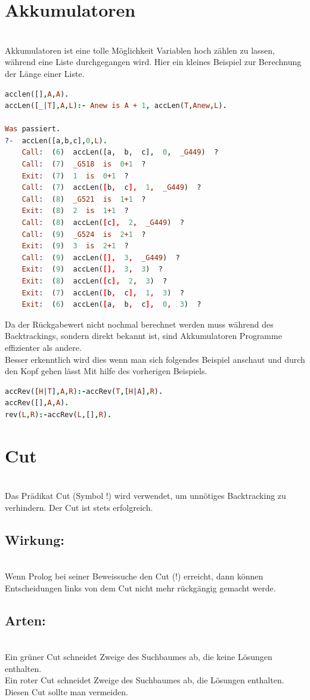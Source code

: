 \section{Akkumulatoren}\qquad\\
Akkumulatoren ist eine tolle Möglichkeit Variablen hoch zählen zu lassen, während eine Liste durchgegangen wird. Hier ein kleines Beispiel zur Berechnung der Länge einer Liste. \\
\begin{lstlisting}[language=Prolog] 
acclen([],A,A).
accLen([_|T],A,L):- Anew is A + 1, accLen(T,Anew,L).

Was passiert.
?-  accLen([a,b,c],0,L).
	Call:  (6)  accLen([a,  b,  c],  0,  _G449)  ?
	Call:  (7)  _G518  is  0+1  ?
	Exit:  (7)  1  is  0+1  ?
	Call:  (7)  accLen([b,  c],  1,  _G449)  ?
	Call:  (8)  _G521  is  1+1  ?
	Exit:  (8)  2  is  1+1  ?
	Call:  (8)  accLen([c],  2,  _G449)  ?
	Call:  (9)  _G524  is  2+1  ?
	Exit:  (9)  3  is  2+1  ?
	Call:  (9)  accLen([],  3,  _G449)  ?
	Exit:  (9)  accLen([],  3,  3)  ?
	Exit:  (8)  accLen([c],  2,  3)  ?
	Exit:  (7)  accLen([b,  c],  1,  3)  ?
	Exit:  (6)  accLen([a,  b,  c],  0,  3)  ? 
\end{lstlisting}
Da der Rückgabewert nicht nochmal berechnet werden muss während des Backtrackings, sondern direkt bekannt ist, sind Akkumulatoren Programme effizienter als andere. \\
Besser erkenntlich wird dies wenn man sich folgendes Beispiel anschaut und durch den Kopf gehen lässt Mit hilfe des vorherigen Beispiels. \\
\begin{lstlisting}[language=Prolog] 
accRev([H|T],A,R):-accRev(T,[H|A],R).
accRev([],A,A).
rev(L,R):-accRev(L,[],R).
\end{lstlisting}
\section{Cut}\qquad\\
Das Prädikat Cut (Symbol !) wird verwendet, um unnötiges Backtracking zu verhindern. Der Cut ist stets erfolgreich.\\
\subsection{Wirkung:}\qquad\\
Wenn Prolog bei seiner Beweissuche den Cut (!) erreicht, dann können Entscheidungen links von dem Cut nicht mehr rückgängig gemacht werde.
\subsection{Arten:}\qquad\\
Ein grüner Cut schneidet Zweige des Suchbaumes ab, die keine Lösungen enthalten.\\
Ein roter Cut schneidet Zweige des Suchbaumes ab, die Lösungen enthalten. Diesen Cut sollte man vermeiden.
